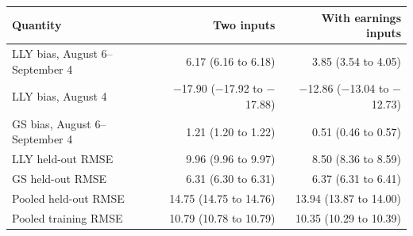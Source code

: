 \begin{tabular}{lrr}
\toprule
Quantity & Two inputs & With earnings inputs \\
\midrule
LLY bias, August 6--September 4 & 6.17 (6.16 to 6.18) & 3.85 (3.54 to 4.05) \\
LLY bias, August 4 & $-$17.90 ($-$17.92 to $-$17.88) & $-$12.86 ($-$13.04 to $-$12.73) \\
GS bias, August 6--September 4 & 1.21 (1.20 to 1.22) & 0.51 (0.46 to 0.57) \\
LLY held-out RMSE & 9.96 (9.96 to 9.97) & 8.50 (8.36 to 8.59) \\
GS held-out RMSE & 6.31 (6.30 to 6.31) & 6.37 (6.31 to 6.41) \\
Pooled held-out RMSE & 14.75 (14.75 to 14.76) & 13.94 (13.87 to 14.00) \\
Pooled training RMSE & 10.79 (10.78 to 10.79) & 10.35 (10.29 to 10.39) \\
\bottomrule
\end{tabular}
